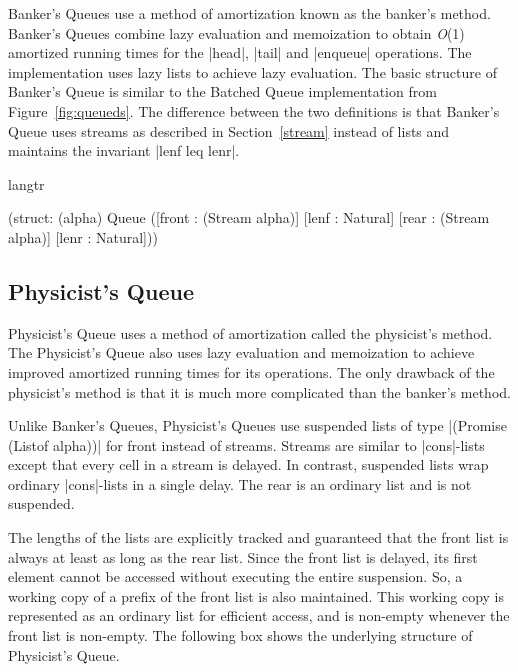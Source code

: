 Banker's Queues \citep{oka} use a method of amortization known as the
banker's method. Banker's Queues combine lazy evaluation and memoization
to obtain \emph{O}(1) amortized running times for the \scheme|head|,
\scheme|tail| and \scheme|enqueue| operations. The implementation uses
lazy lists to achieve lazy evaluation. The basic structure of Banker's
Queue is similar to the Batched Queue implementation from
Figure~\ref{fig:queueds}. The difference between the two definitions is
that Banker's Queue uses streams as described in Section~\ref{stream}
instead of lists and maintains the invariant \scheme|lenf leq lenr|.

\begin{datastructure}
\begin{schemedisplay}
  langtr

  (struct: (alpha) Queue
    ([front : (Stream alpha)]
     [lenf  : Natural]
     [rear  : (Stream alpha)]
     [lenr  : Natural]))

\end{schemedisplay}
\end{datastructure}


\subsection*{Physicist's Queue}
\label{phy}
Physicist's Queue \citep{oka} uses a method of amortization called the
physicist's method. The Physicist's Queue also uses lazy evaluation and
memoization to achieve improved amortized running times for its
operations. The only drawback of the physicist's method is that it is
much more complicated than the banker's method.

Unlike Banker's Queues, Physicist's Queues use suspended lists of type
\scheme|(Promise (Listof alpha))| for front instead of streams. Streams
are similar to \scheme|cons|-lists except that every cell in a stream is
delayed. In contrast, suspended lists wrap ordinary \scheme|cons|-lists
in a single delay. The rear is an ordinary list and is not suspended.

The lengths of the lists are explicitly tracked and guaranteed that the
front list is always at least as long as the rear list. Since the front
list is delayed, its first element cannot be accessed without executing
the entire suspension. So, a working copy of a prefix of the front list
is also maintained. This working copy is represented as an ordinary list
for efficient access, and is non-empty whenever the front list is
non-empty. The following box shows the underlying structure of
Physicist's Queue.

